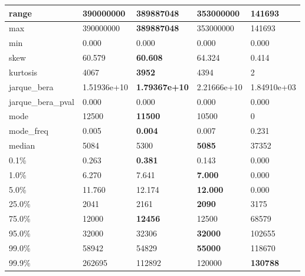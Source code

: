 \begin{table}[H]
\begin{tabular}{|l|m{10em}|m{10em}|m{10em}|m{10em}|}
\hline range & 390000000 & \bfseries 389887048 & 353000000 & \cellcolor[rgb]{0.9, 0.54, 0.52} 141693 \\
\hline max & 390000000 & \bfseries 389887048 & 353000000 & \cellcolor[rgb]{0.9, 0.54, 0.52} 141693 \\
\hline min & 0.000 & 0.000 & 0.000 & 0.000 \\
\hline skew & 60.579 & \bfseries 60.608 & 64.324 & \cellcolor[rgb]{0.9, 0.54, 0.52} 0.414 \\
\hline kurtosis & 4067 & \bfseries 3952 & 4394 & \cellcolor[rgb]{0.9, 0.54, 0.52} 2 \\
\hline jarque\_bera & 1.51936e+10 & \bfseries 1.79367e+10 & 2.21666e+10 & \cellcolor[rgb]{0.9, 0.54, 0.52} 1.84910e+03 \\
\hline jarque\_bera\_pval & 0.000 & 0.000 & 0.000 & 0.000 \\
\hline mode & 12500 & \bfseries 11500 & 10500 & \cellcolor[rgb]{0.9, 0.54, 0.52} 0 \\
\hline mode\_freq & 0.005 & \bfseries 0.004 & 0.007 & \cellcolor[rgb]{0.9, 0.54, 0.52} 0.231 \\
\hline median & 5084 & 5300 & \bfseries 5085 & \cellcolor[rgb]{0.9, 0.54, 0.52} 37352 \\
\hline 0.1\% & 0.263 & \bfseries 0.381 & 0.143 & \cellcolor[rgb]{0.9, 0.54, 0.52} 0.000 \\
\hline 1.0\% & 6.270 & 7.641 & \bfseries 7.000 & \cellcolor[rgb]{0.9, 0.54, 0.52} 0.000 \\
\hline 5.0\% & 11.760 & 12.174 & \bfseries 12.000 & \cellcolor[rgb]{0.9, 0.54, 0.52} 0.000 \\
\hline 25.0\% & 2041 & 2161 & \bfseries 2090 & \cellcolor[rgb]{0.9, 0.54, 0.52} 3175 \\
\hline 75.0\% & 12000 & \bfseries 12456 & 12500 & \cellcolor[rgb]{0.9, 0.54, 0.52} 68579 \\
\hline 95.0\% & 32000 & 32306 & \bfseries 32000 & \cellcolor[rgb]{0.9, 0.54, 0.52} 102655 \\
\hline 99.0\% & 58942 & 54829 & \bfseries 55000 & \cellcolor[rgb]{0.9, 0.54, 0.52} 118670 \\
\hline 99.9\% & 262695 & \cellcolor[rgb]{0.9, 0.54, 0.52} 112892 & 120000 & \bfseries 130788 \\
\hline
\end{tabular}
\end{table}
